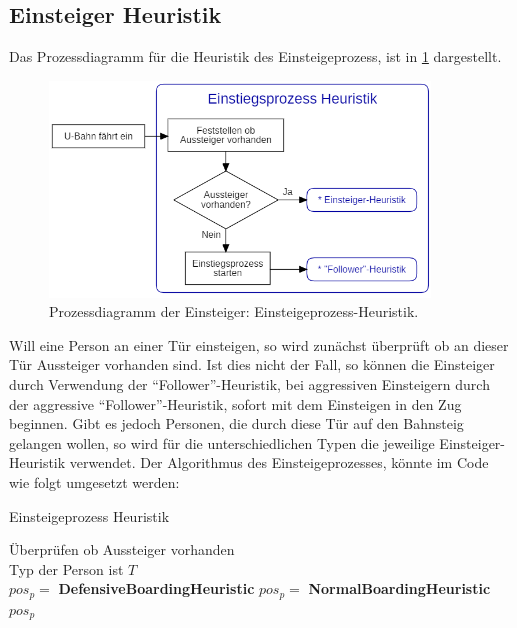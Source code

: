 \subsection{Einsteiger Heuristik} \label{EM}
Das Prozessdiagramm für die Heuristik des Einsteigeprozess, ist in \figurename \ref{fig:EH} dargestellt. 
\begin{figure}[H]
	\centering
		\includegraphics[width=0.9\textwidth]{pictures/model/algorithm/boarding/boarding_process.png}
	\caption{Prozessdiagramm der Einsteiger: Einsteigeprozess-Heuristik.}
	\label{fig:EH}
\end{figure}
Will eine Person an einer Tür einsteigen, so wird zunächst überprüft ob an dieser Tür Aussteiger vorhanden sind. Ist dies nicht der Fall, so können die Einsteiger durch Verwendung der "`Follower"'-Heuristik, bei aggressiven Einsteigern durch der aggressive "`Follower"'-Heuristik, sofort mit dem Einsteigen in den Zug beginnen. Gibt es jedoch Personen, die durch diese Tür auf den Bahnsteig gelangen wollen, so wird für die unterschiedlichen Typen die jeweilige Einsteiger-Heuristik verwendet. Der Algorithmus des Einsteigeprozesses, könnte im Code wie folgt umgesetzt werden:

\begin{algorithm} [H]
	\caption{Einsteigeprozess Heuristik}
	
	\BoardingHeuristic{} {
		Überprüfen ob Aussteiger vorhanden\\
		Typ der Person ist $T$\\
		 {
			 { 
				$pos_p = $ \textbf{DefensiveBoardingHeuristic}
			} {
				$pos_p = $ \textbf{NormalBoardingHeuristic} 	
			} 
		} 
		\Return $pos_p$
	}
\end{algorithm}

